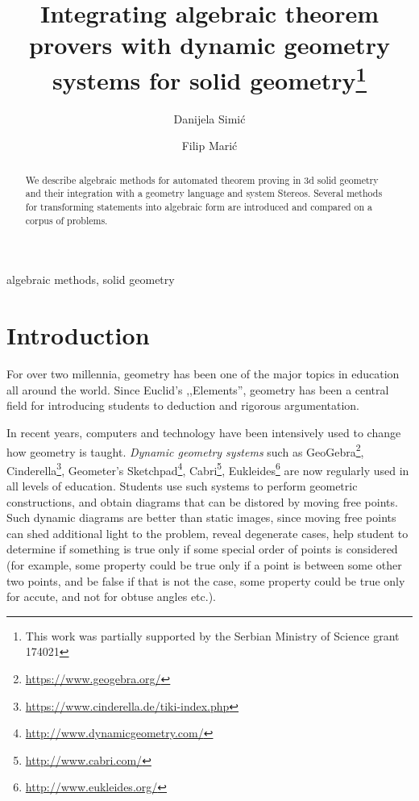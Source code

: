 \documentclass[final,1p,times,authoryear]{elsarticle}
\begin{document}
\begin{frontmatter}

\title{Integrating algebraic theorem provers with dynamic geometry
  systems for solid geometry\footnote{This work was partially
    supported by the Serbian Ministry of Science grant 174021}}

\author{Danijela Simi\' c}
\address{School of Mathematics, University of Belgrade, Studentski trg 16, 11000, Belgrade, Serbia}

\author{Filip Mari\' c}
\address{School of Mathematics, University of Belgrade, Studentski trg 16, 11000, Belgrade, Serbia}
\begin{abstract}
We describe algebraic methods for automated theorem proving in 3d
solid geometry and their integration with a geometry language and
system Stereos. Several methods for transforming statements into
algebraic form are introduced and compared on a corpus of problems.
\end{abstract}

\begin{keyword}
algebraic methods, solid geometry
\end{keyword}
\end{frontmatter}


\section{Introduction}
For over two millennia, geometry has been one of the major topics in
education all around the world. Since Euclid's ,,Elements'', geometry
has been a central field for introducing students to deduction and
rigorous argumentation. 

In recent years, computers and technology have been intensively used
to change how geometry is taught. \emph{Dynamic geometry systems} such
as GeoGebra\footnote{\url{https://www.geogebra.org/}},
Cinderella\footnote{\url{https://www.cinderella.de/tiki-index.php}},
Geometer's Sketchpad\footnote{\url{http://www.dynamicgeometry.com/}},
Cabri\footnote{\url{http://www.cabri.com/}},
Eukleides\footnote{\url{http://www.eukleides.org/}} are now regularly
used in all levels of education. Students use such systems to perform
geometric constructions, and obtain diagrams that can be distored by
moving free points. Such dynamic diagrams are better than static
images, since moving free points can shed additional light to the
problem, reveal degenerate cases, help student to determine if
something is true only if some special order of points is considered
(for example, some property could be true only if a point is between
some other two points, and be false if that is not the case, some
property could be true only for accute, and not for obtuse angles
etc.).
\end{document}
